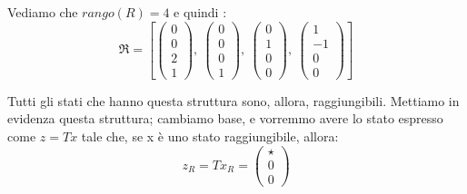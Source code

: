 \documentclass{article}
\begin{document}
Vediamo che $rango(R) = 4$ e quindi : \[ \mathfrak{R} = \left[ \left(\begin{matrix}0\\0\\2\\1\end{matrix}\right), \  \left(\begin{matrix}0\\0\\0\\1\end{matrix}\right), \  \left(\begin{matrix}0\\1\\0\\0\end{matrix}\right), \  \left(\begin{matrix}1\\-1\\0\\0\end{matrix}\right)\right] \]

Tutti gli stati che hanno questa struttura sono, allora, raggiungibili. Mettiamo in evidenza questa struttura;
cambiamo base, e vorremmo avere lo stato espresso come $z = Tx$ tale che, se x è uno stato raggiungibile, allora: \[ z_R = T x_R = \begin{pmatrix} \star  \\ 0 \\0\end{pmatrix}\]
\end{document}
